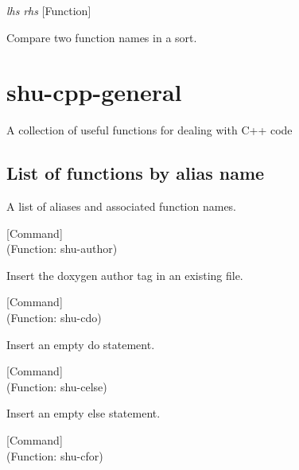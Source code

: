 \vspace{1em}
\noindent
{}
\usebox{\funcname}\emph{lhs} \emph{rhs}
 \hfill [Function]

\begin{doc-string}
Compare two function names in a sort.
\end{doc-string}

\section{shu-cpp-general}


A collection of useful functions for dealing with C++ code


\subsection{List of functions by alias name}

A list of aliases and associated function names.



\vspace{1em}
\noindent
{}
\usebox{\funcname}
 \hfill [Command]\\%
 (Function: shu-author)

\begin{doc-string}
Insert the doxygen author tag in an existing file.
\end{doc-string}

\vspace{1em}
\noindent
{}
\usebox{\funcname}
 \hfill [Command]\\%
 (Function: shu-cdo)

\begin{doc-string}
Insert an empty do statement.
\end{doc-string}

\vspace{1em}
\noindent
{}
\usebox{\funcname}
 \hfill [Command]\\%
 (Function: shu-celse)

\begin{doc-string}
Insert an empty else statement.
\end{doc-string}

\vspace{1em}
\noindent
{}
\usebox{\funcname}
 \hfill [Command]\\%
 (Function: shu-cfor)

